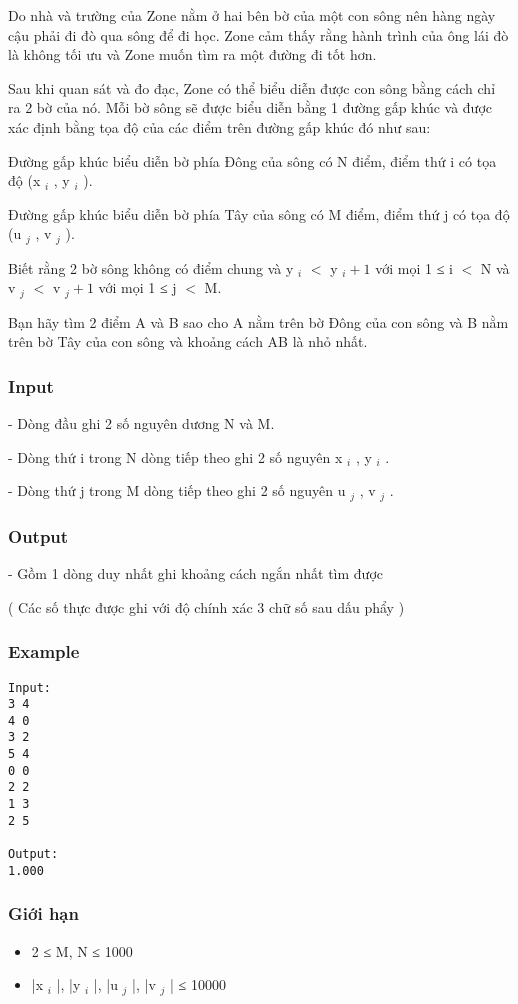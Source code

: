 



   Do nhà và trường của Zone nằm ở hai bên bờ của một con sông nên hàng ngày cậu phải đi đò qua sông để đi học. Zone cảm thấy rằng hành trình của ông lái đò là không tối ưu và Zone muốn tìm ra một đường đi tốt hơn.  

   Sau khi quan sát và đo đạc, Zone có thể biểu diễn được con sông bằng cách chỉ ra 2 bờ của nó. Mỗi bờ sông sẽ được biểu diễn bằng 1 đường gấp khúc và được xác định bằng tọa độ của các điểm trên đường gấp khúc đó như sau:  

   Đường gấp khúc biểu diễn bờ phía Đông của sông có N điểm, điểm thứ i có tọa độ (x   $_    i   $   , y   $_    i   $   ).  

   Đường gấp khúc biểu diễn bờ phía Tây của sông có M điểm, điểm thứ j có tọa độ (u   $_    j   $   , v   $_    j   $   ).  

   Biết rằng 2 bờ sông không có điểm chung và y   $_    i   $   $<$ y   $_    i+1   $   với mọi 1 ≤ i $<$ N và v   $_    j   $   $<$ v   $_    j+1   $   với mọi 1 ≤ j $<$ M.  

   Bạn hãy tìm 2 điểm A và B sao cho A nằm trên bờ Đông của con sông và B nằm trên bờ Tây của con sông và khoảng cách AB là nhỏ nhất.  

\subsubsection{   Input  }

   - Dòng đầu ghi 2 số nguyên dương N và M.  

   - Dòng thứ i trong N dòng tiếp theo ghi 2 số nguyên x   $_    i   $   , y   $_    i   $   .  

   - Dòng thứ j trong M dòng tiếp theo ghi 2 số nguyên u   $_    j   $   , v   $_    j   $   .  

\subsubsection{   Output  }

   - Gồm 1 dòng duy nhất ghi khoảng cách ngắn nhất tìm được  

   ( Các số thực được ghi với độ chính xác 3 chữ số sau dấu phẩy )  



\subsubsection{   Example  }
\begin{verbatim}
Input:
3 4
4 0
3 2
5 4
0 0
2 2
1 3
2 5

Output:
1.000
\end{verbatim}

\subsubsection{   Giới hạn  }
\begin{itemize}
	\item     2 ≤ M, N ≤ 1000   
	\item     |x    $_     i    $    |, |y    $_     i    $    |, |u    $_     j    $    |, |v    $_     j    $    | ≤ 10000   
\end{itemize}